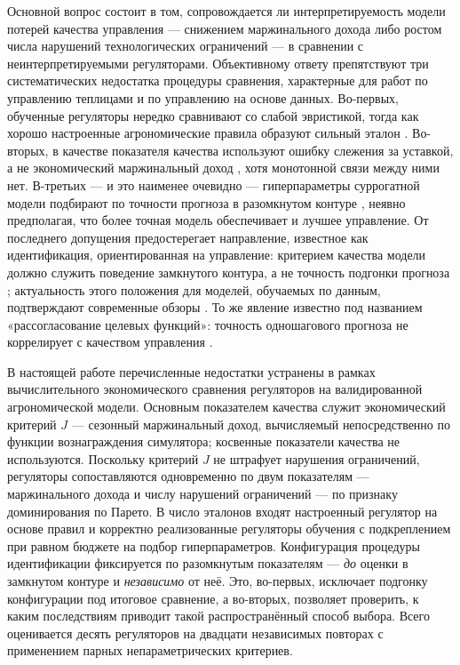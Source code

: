 \documentclass[12pt,a4paper,leqno]{article}
\begin{document}
Основной вопрос состоит в том, сопровождается ли интерпретируемость модели потерей качества
управления — снижением маржинального дохода либо ростом числа нарушений технологических
ограничений — в сравнении с неинтерпретируемыми регуляторами. Объективному ответу
препятствуют три систематических недостатка процедуры сравнения, характерные для работ
по управлению теплицами и по управлению на основе данных. Во-первых, обученные
регуляторы нередко сравнивают со слабой эвристикой, тогда как хорошо настроенные
агрономические правила образуют сильный эталон
\cite{morcego2023,mallick2024,vanlaatum2025}. Во-вторых, в качестве показателя
качества используют ошибку слежения за уставкой, а не экономический маржинальный доход
\cite{lin2021,morcego2023}, хотя монотонной связи между ними нет. В-третьих — и это
наименее очевидно — гиперпараметры суррогатной модели подбирают по точности прогноза в
разомкнутом контуре \cite{kaiser2018,yonezawa2025}, неявно предполагая, что более
точная модель обеспечивает и лучшее управление. От последнего допущения предостерегает
направление, известное как идентификация, ориентированная на управление: критерием
качества модели должно служить поведение замкнутого контура, а не точность подгонки
прогноза \cite{ljung1991,gevers1993,vandenhof1995}; актуальность этого положения для
моделей, обучаемых по данным, подтверждают современные обзоры
\cite{wei2023,controlorientedsurvey2025}. То же явление известно под названием
«рассогласование целевых функций»: точность одношагового прогноза не коррелирует с
качеством управления \cite{lambert2020,jackson2022}.

В настоящей работе перечисленные недостатки устранены в рамках вычислительного
экономического сравнения регуляторов на валидированной агрономической модели. Основным
показателем качества служит экономический критерий $J$ — сезонный маржинальный доход, вычисляемый
непосредственно по функции вознаграждения симулятора; косвенные показатели качества не
используются. Поскольку критерий $J$ не штрафует нарушения ограничений, регуляторы
сопоставляются одновременно по двум показателям — маржинального дохода и числу нарушений
ограничений — по признаку доминирования по Парето. В
число эталонов входят настроенный регулятор на основе правил и корректно реализованные
регуляторы обучения с подкреплением при равном бюджете на подбор гиперпараметров.
Конфигурация процедуры идентификации фиксируется по разомкнутым показателям —
\emph{до} оценки в замкнутом контуре и \emph{независимо} от неё. Это, во-первых,
исключает подгонку конфигурации под итоговое сравнение, а во-вторых, позволяет
проверить, к каким последствиям приводит такой распространённый способ выбора. Всего
оценивается десять регуляторов на двадцати независимых повторах с применением парных
непараметрических критериев.
\end{document}
